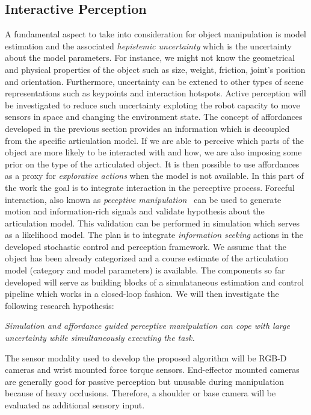\subsection{Interactive Perception}
A fundamental aspect to take into consideration for object manipulation is model estimation and the associated \emph{hepistemic uncertainty} which is the uncertainty about the model parameters. For instance, we might not know the geometrical and physical properties of the object such as size, weight, friction, joint's position and orientation. Furthermore, uncertainty can be extened to other types of scene representations such as keypoints and interaction hotspots. Active perception will be investigated to reduce such uncertainty exploting the robot capacity to move sensors in space and changing the environment state. The concept of affordances developed in the previous section provides an information which is decoupled from the specific articulation model. If we are able to perceive which parts of the object are more likely to be interacted with and how, we are also imposing some prior on the type of the articulated object. It is then possible to use affordances as a proxy for \emph{explorative actions} when the model is not available. In this part of the work the goal is to integrate interaction in the perceptive process. Forceful interaction, also known as \emph{peceptive manipulation}~\cite{bohg2017interactive} can be used to generate motion and information-rich signals and  validate hypothesis about the articulation model. This validation can be performed in simulation which serves as a likelihood model. The plan is to integrate \emph{information seeking} actions in the developed stochastic control and perception framework. We assume that the object has been already categorized and a course estimate of the articulation model (category and model parameters) is available. The components so far developed will serve as building blocks of a simulataneous estimation and control pipeline which works in a closed-loop fashion. We will then investigate the following research hypothesis:
\begin{displayquote}
\textit{Simulation and affordance guided perceptive manipulation can cope with large uncertainty while simultaneously executing the task.} 
\end{displayquote}
The sensor modality used to develop the proposed algorithm will be RGB-D cameras and wrist mounted force torque sensors. End-effector mounted cameras are generally good for passive perception but unusable during manipulation because of heavy occlusions. Therefore, a shoulder or base camera will be evaluated as additional sensory input.  
 
